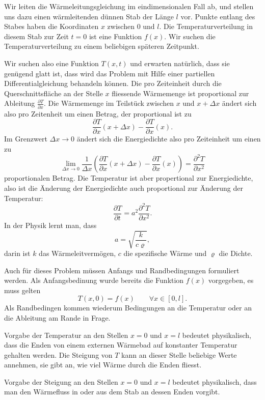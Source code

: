 Wir leiten die Wärmeleitungsgleichung im eindimensionalen Fall ab, und stellen
uns dazu einen wärmleitenden dünnen Stab der Länge $l$ vor. Punkte
entlang des Stabes haben die Koordinaten $x$ zwischen $0$ und $l$.
Die Temperaturverteilung in diesem Stab zur Zeit $t=0$ ist eine Funktion
$f(x)$. Wir suchen die Temperaturverteilung zu einem beliebigen späteren Zeitpunkt.

Wir suchen also eine Funktion $T(x,t)$ und erwarten natürlich, dass sie
genügend glatt ist, dass wird das Problem mit Hilfe einer partiellen
Differentialgleichung behandeln können. Die pro Zeiteinheit
durch die Querschnittsfläche an der Stelle $x$ fliessende Wärmemenge ist
proportional zur Ableitung $\frac{\partial T}{\partial x}$.
Die Wärmemenge im Teilstück zwischen $x$ und $x+\Delta x$ ändert sich also
pro Zeitenheit um einen Betrag, der proportional ist zu
\[
\frac{\partial T}{\partial x}(x+\Delta x)-\frac{\partial T}{\partial x}(x).
\]
Im Grenzwert $\Delta x\to 0$
ändert sich die Energiedichte also pro Zeiteinheit um einen zu
\[
\lim_{\Delta x\to 0}\frac1{\Delta x}\left(\frac{\partial T}{\partial x}(x+\Delta x)-\frac{\partial T}{\partial x}(x)\right)
=\frac{\partial^2T}{\partial x^2}
\]
proportionalen Betrag.
Die Temperatur ist aber propertional zur Energiedichte, also ist die Änderung
der Energiedichte auch proportional zur Änderung der Temperatur:
\[
\frac{\partial T}{\partial t}=a^2\frac{\partial^2T}{\partial x^2}.
\]
In der Physik lernt man, dass
\[
a=\sqrt{\frac{k}{c\varrho}},
\]
darin ist $k$ das Wärmeleitvermögen, $c$ die spezifische Wärme
und $\varrho$ die Dichte.

Auch für dieses Problem müssen Anfangs und Randbedingungen formuliert werden.
Als Anfangsbedinung wurde bereits die Funktion $f(x)$ vorgegeben, es muss
gelten
\[
T(x,0)=f(x)\qquad \forall x\in[0,l].
\]
Als Randbedingen kommen wiederum Bedingungen an die Temperatur oder an die
Ableitung am Rande in Frage.

Vorgabe der Temperatur an den Stellen $x=0$ und $x=l$ bedeutet physikalisch, dass
die Enden von einem externen Wärmebad auf konstanter Temperatur gehalten
werden. Die Steigung von $T$ kann an dieser Stelle beliebige Werte annehmen,
sie gibt an, wie viel Wärme durch die Enden fliesst.

Vorgabe der Steigung an den Stellen $x=0$ und $x=l$ bedeutet physikalisch,
dass man den Wärmefluss in oder aus dem Stab an dessen Enden vorgibt.


